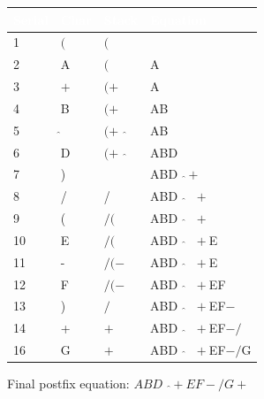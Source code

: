 \documentclass[11 pt]{article}
\begin{document}
\begin{center}
\begin{longtable}{|| m{2.8 em} || m{5 em} m{5 em} m{9 em} ||}
	\hline
	\rowcolor{black}
	\textbf{\textcolor{white}{Serial}} & \textbf{\textcolor{white}{Char}} & \textbf{\textcolor{white}{Stack}} & \textbf{\textcolor{white}{Equation}} \\
	\hline\hline\hline\hline
	1 & $($ & $($ &  \\
	2 & A & $($ & A \\
	3 & $+$ & $(+$ & A \\
	4 & B & $(+$ & AB \\
	5 & $\hat{ }$ & $(+\textrm{ }\hat{ }$ & AB \\
	6 & D & $(+\textrm{ }\hat{ }$ & ABD \\
	7 & ) & & ABD$\textrm{ }\hat{ }+$ \\
	8 & / & / & ABD$\textrm{ }\hat{ }\textrm{ }+$ \\
	9 & ( & $/($ & ABD$\textrm{ }\hat{ }\textrm{ }+$ \\
	10 & E & $/($ & ABD$\textrm{ }\hat{ }\textrm{ }+$E \\
	11 & - & $/(-$ & ABD$\textrm{ }\hat{ }\textrm{ }+$E \\
	12 & F & $/(-$ & ABD$\textrm{ }\hat{ }\textrm{ }+$EF \\
	13 & ) & $/$ & ABD$\textrm{ }\hat{ }\textrm{ }+$EF$-$ \\
	14 & + & $+$ & ABD$\textrm{ }\hat{ }\textrm{ }+$EF$-/$ \\
	16 & G & $+$ & ABD$\textrm{ }\hat{ }\textrm{ }+$EF$-/$G \\
\end{longtable}
\end{center}
Final postfix equation: $ABD\textrm{ }\hat{ }+EF-/G+$

\pagebreak
\end{document}
